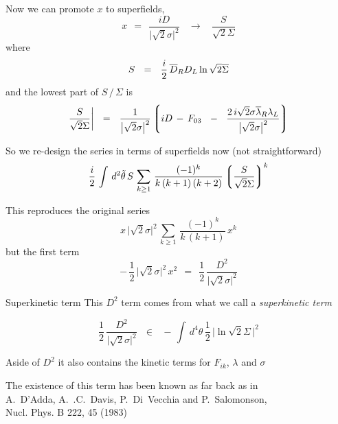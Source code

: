 \documentclass{beamer}
\begin{document}
\begin{frame}{}

	Now we can promote $ x $ to superfields,
\[
	x    ~~=~~    \frac{iD}{\big|\sqrt{2}\sigma\big|^2}    ~~~~\longrightarrow~~~~
		\frac{S}{\sqrt{2}\Sigma}
\]
	where 
\[
	S    ~~=~~    \frac{i}{2}\,\overline D{}_R D_L \ln \sqrt{2}\overline\Sigma
\]
	and the lowest part of $ S \,/\, \Sigma $ is
\[
	\frac{S}{\sqrt{2}\Sigma} \bigg|    ~~=~~
		\frac{1}{\big|\sqrt{2}\sigma\big|^2}
		\left\lgroup
			iD \,-\, F_{03}
			~~-~~
			\frac{2\, i\sqrt{2}\sigma \overline\lambda{}_R\lambda_L}{\big|\sqrt{2}\sigma\big|^2}
		\right\rgroup
\]
\end{frame}


\begin{frame}{}

	So we re-design the series in terms of superfields now
	(not straightforward)
\[
	\frac{i}{2}\, 
	\int\, d^2\tilde\theta\,
	S\,
	\sum_{k \geq 1}\, \frac{    (-1)^k    }
			   {  k\,(k + 1)\,(k + 2)  } \left\lgroup \frac{S}{\sqrt{2}\Sigma} \right\rgroup^k
\]

	This reproduces the original series 
\[
		x\, \big|\sqrt{2}\sigma\big|^2\,
		\sum_{k \geq 1}\, \frac{(-1)^k} 
                                      { k\,(k + 1) }\, x^k 
\]
	but the first term
\[
	-\, \frac{1}{2}\, \big|\sqrt{2}\sigma\big|^2\, x^2   ~~=~~  \frac{1}{2}\,\frac{D^2}{\big|\sqrt{2}\sigma\big|^2}
\]

\end{frame}

\begin{frame}{Superkinetic term}
	This $ D^2 $ term comes from what we call a {\it superkinetic term}

\[
	\frac{1}{2}\,\frac{D^2}{\big|\sqrt{2}\sigma\big|^2}  ~~~\in~~~
	-\, \int\, d^4\theta\, \frac{1}{2}\, \Big| \ln \sqrt{2}\Sigma \, \Big|^2
\]

	Aside of $ D^2 $ it also contains the kinetic terms for $ F_{ik} $, $ \lambda $ and $ \sigma $

	The existence of this term has been known as far back as in\\
	{\sc A.~D'Adda, A.~.C.~Davis, P.~Di~Vecchia and P.~Salomonson,\\
	     Nucl. Phys. B 222, 45 (1983)}
\end{frame}
\end{document}
